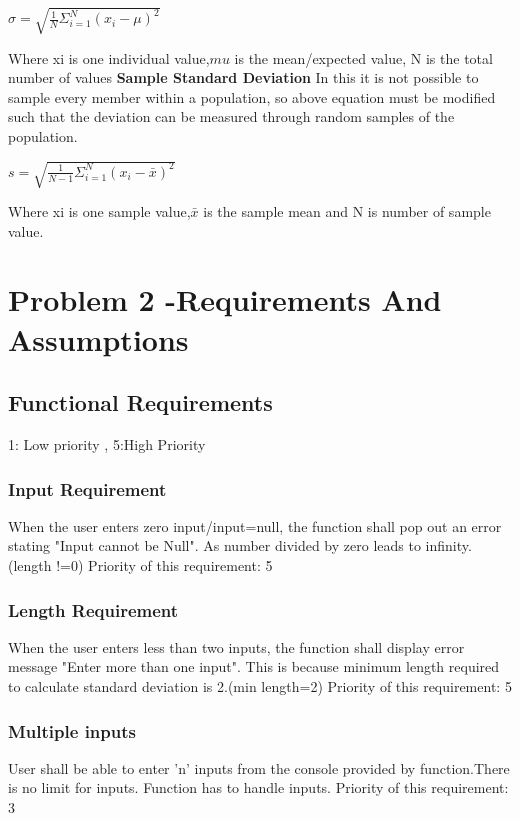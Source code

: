 \documentclass[a4paper,11pt]{article}
\begin{document}
\begin{titlepage}
\begin{center}
\begin{math}
\sigma=\sqrt{\frac{1}{N}\Sigma_{i=1}^{N}(x_{i}-\mu)^2}
\end{math}
\end{center}
Where xi is one individual value,$mu$ is the mean/expected value, N is the total number of values
\newline
\newline
\textbf{Sample Standard Deviation}
\newline
In this it is not possible to sample every member within a population, so above equation must be modified such that the deviation can be measured through random samples of the population. 
\begin{center}
\begin{math}
s= \sqrt{\frac{1}{N-1}\Sigma_{i=1}^{N}(x_{i}-\bar{x})^2}
\end{math}
\end{center}
Where xi is one sample value,$\bar{x}$ is the sample mean and N is number of sample value.

\section{Problem 2 -Requirements And Assumptions}
\subsection{Functional Requirements}
1: Low priority , 5:High Priority
\subsubsection{Input Requirement}
When the user enters zero input/input=null, the function shall pop out an error stating "Input cannot be Null". As number divided by zero leads to infinity. (length !=0)\newline
Priority of this requirement: 5
\subsubsection{Length Requirement}
When the user enters less than two inputs, the function shall display error message "Enter more than one input". This is because minimum length required to calculate standard deviation is 2.(min length=2)\newline
Priority of this requirement: 5
\subsubsection{Multiple inputs}
User shall be able to enter 'n' inputs from the console provided by function.There is no limit for inputs. Function has to handle inputs.\newline
Priority of this requirement: 3

\end{titlepage}
\end{document}
